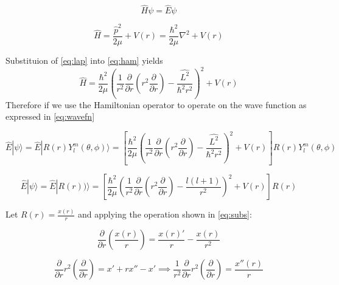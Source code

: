 \documentclass[12pt]{article}
\begin{document}
\begin{equation}
\label{eq:egg}
\hat{H}\psi=\hat{E}\psi
\end{equation}
\noindent

\begin{equation}
\label{eq:ham}
\hat{H}=\frac{\hat{p}^{2}}{2\mu}+V(r)=\frac{\hbar^{2}}{2\mu}\nabla^{2}+V(r)
\end{equation}

\noindent
Substituion of \cref{eq:lap} into \cref{eq:ham} yields
\begin{equation}
\label{eq:hamlap}
\hat{H}=\frac{\hbar^{2}}{2\mu}{\left(\frac{1}{r^{2}}\frac{\partial}{\partial{r}} \left(r^{2 }\frac{\partial}{\partial{r}}\right)-
\frac{\hat{L^{2}}}{\hbar^{2} r^{2}}\right)^{2}}+V(r)
\end{equation}
\noindent
Therefore if we use the Hamiltonian operator to operate on the wave function as expressed in \cref{eq:wavefn} 

\begin{equation}
\label{eq:hamlap}
\hat{E} | \psi  \rangle =\hat{E} | R(r)Y_{l}^{m}(\theta,\phi)  \rangle =\left[\frac{\hbar^{2}}{2\mu}{\left(\frac{1}{r^{2}}\frac{\partial}{\partial{r}} \left(r^{2 }\frac{\partial}{\partial{r}}\right)-
\frac{\hat{L^{2}}}{\hbar^{2} r^{2}}\right)^{2}}+V(r)\right]R(r)Y_{l}^{m}(\theta,\phi)
\end{equation}


\begin{equation}
\label{eq:hamlapr}
\hat{E} | \psi  \rangle =\hat{E} | R(r))  \rangle =\left[\frac{\hbar^{2}}{2\mu}{\left(\frac{1}{r^{2}}\frac{\partial}{\partial{r}} \left(r^{2 }\frac{\partial}{\partial{r}}\right)-
\frac{l(l+1)}{r^{2}}\right)^{2}}+V(r)\right]R(r)
\end{equation}

Let $R(r)=\frac{x(r)}{r}$ and applying the operation shown in \cref{eq:subs}:

\begin{equation}
\label{eq:subs}
\frac{\partial}{\partial r}\left(\frac{x(r)}{r}\right)=\frac{x(r)'}{r}-\frac{x(r)}{r^{2}}
\end{equation}


\begin{equation}
\label{eq:subs2}
\frac{\partial}{\partial r}r^{2}\left(\frac{\partial}{\partial r}\right)=x'+rx''-x'\implies 
\frac{1}{r^{2}}\frac{\partial}{\partial r}r^{2}\left(\frac{\partial}{\partial r}\right)=\frac{x''(r)}{r}
\end{equation}

\end{document}
